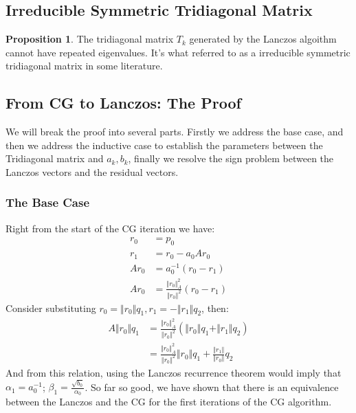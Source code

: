 \documentclass[]{article}
\theoremstyle{definition}
\newtheorem{prop}{Proposition}[section]  %
\begin{document}
\begin{appendices}
        \subsection{Irreducible Symmetric Tridiagonal Matrix}
            \begin{prop}
                The tridiagonal matrix $T_k$ generated by the Lanczos algoithm cannot have repeated eigenvalues. It's what referred to as a irreducible symmetric tridiagonal matrix in some literature. 
            \end{prop}
    \subsection{From CG to Lanczos: The Proof}\label{sec:From_CG_to_Lanczos:The_Proof}
        We will break the proof into several parts. Firstly we address the base case, and then we address the inductive case to establish the parameters between the Tridiagonal matrix and $a_k, b_k$, finally we resolve the sign problem between the Lanczos vectors and the residual vectors. 
        \subsubsection{The Base Case}
            Right from the start of the CG iteration we have: 
            \begin{align}
                r_0 &= p_0
                \\
                r_1 &= r_0 - a_0Ar_0
                \\
                Ar_0 &= a_0^{-1}(r_0 - r_1)
                \\
                Ar_0 &= \frac{\Vert r_0\Vert_A^2}{\Vert r_0\Vert^2}(r_0 - r_1)
            \end{align}
            Consider substituting $r_0 = \Vert r_0\Vert q_1, r_1 = -\Vert r_1\Vert q_2$, then: 
            \begin{align}
                A\Vert r_0\Vert q_1 
                &= \frac{\Vert r_0\Vert_A^2}{\Vert r_0\Vert^2}\left(
                    \Vert r_0\Vert q_1 + \Vert r_1\Vert q_2
                \right)
                \\
                &= 
                \frac{\Vert r_0\Vert_A^2}{\Vert r_0\Vert^2}\Vert r_0\Vert q_1 + 
                    \frac{\Vert r_1\Vert}{\Vert r_0\Vert} q_2
            \end{align}
            And from this relation, using the Lanczos recurrence theorem would imply that $\alpha_1 = a_0^{-1}$; $\beta_1 = \frac{\sqrt{b_0}}{\alpha_0}$. So far so good, we have shown that there is an equivalence between the Lanczos and the CG for the first iterations of the CG algorithm. 

\end{appendices}
\end{document}
